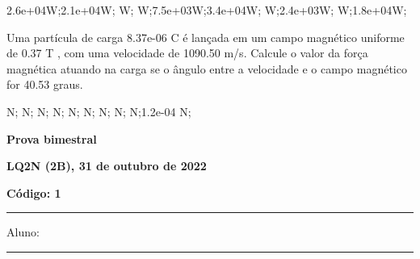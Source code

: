 \documentclass[12pt, addpoints]{exam}
\begin{document}
\begin{questions}
\begin{multicols*}{2}
\begin{oneparchoices}
\choice 2.6e+04W;\choice 2.1e+04W; W; W;\choice 7.5e+03W;\choice 3.4e+04W; W;\choice 2.4e+03W; W;\choice 1.8e+04W;\end{oneparchoices}
\question[20] Uma partícula de carga 8.37e-06 C é lançada em um campo magnético uniforme de    0.37 T , com uma velocidade de 1090.50 m/s. Calcule o valor da força magnética atuando na carga se o ângulo entre a velocidade e o campo magnético for   40.53 graus.

\begin{oneparchoices}
 N; N; N; N; N; N; N; N; N;\choice 1.2e-04 N;\end{oneparchoices}
\end{multicols*}
\end{questions}
\newpage
        \begin{minipage}[b]{0.75\linewidth}
            \begin{flushleft}
                {\bf \large Prova bimestral}
            \end{flushleft}
            \begin{flushleft}
                {\bf \large LQ2N (2B), 31 de outubro de 2022}
            \end{flushleft}
        \end{minipage}
        \begin{minipage}[b]{0.20\linewidth}
            \begin{flushright}
                {\bf \large Código: 1}
            \end{flushright}
        \end{minipage}
        \vspace{0.5cm} \hrule \vspace{0.5cm}
        \begin{minipage}{0.75\linewidth}
            Aluno:
        \end{minipage}
        \vspace{0.5cm} \hrule \vspace{0.5cm}
\end{document}
